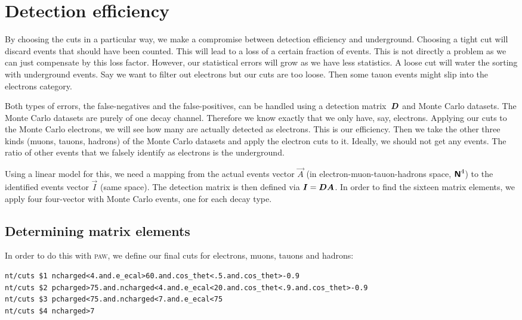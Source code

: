 \documentclass[11pt, english, fleqn, DIV=15, headinclude, BCOR=2cm]{scrreprt}
\begin{document}
\section{Detection efficiency}
\label{sec:detection-efficiency}

By choosing the cuts in a particular way, we make a compromise between
detection efficiency and underground. Choosing a tight cut will discard events
that should have been counted. This will lead to a loss of a certain fraction
of events. This is not directly a problem as we can just compensate by this
loss factor. However, our statistical errors will grow as we have less
statistics. A loose cut will water the sorting with underground events. Say we
want to filter out electrons but our cuts are too loose. Then some tauon events
might slip into the electrons category.

Both types of errors, the false-negatives and the false-positives, can be
handled using a detection matrix~$\mat D$ and Monte Carlo datasets.
The Monte Carlo datasets are purely of one decay channel. Therefore we know
exactly that we only have, say, electrons. Applying our cuts to the Monte Carlo
electrons, we will see how many are actually detected as electrons. This is our
efficiency. Then we take the other three kinds (muons, tauons, hadrons) of the
Monte Carlo datasets and apply the electron cuts to it. Ideally, we should not
get any events. The ratio of other events that we falsely identify as electrons
is the underground.

Using a linear model for this, we need a mapping from the actual events vector
$\vec A$ (in electron-muon-tauon-hadrons space, $\text{\bfseries\sffamily{N}}^4$) to the identified events
vector $\vec I$ (same space). The detection matrix is then defined via $\vec I
= \mat D \vec A$. In order to find the sixteen matrix elements, we apply four
four-vector with Monte Carlo events, one for each decay type.

\subsection{Determining matrix elements}

In order to do this with \textsc{paw}, we define our final cuts for electrons,
muons, tauons and hadrons:

\begin{lstlisting}
nt/cuts $1 ncharged<4.and.e_ecal>60.and.cos_thet<.5.and.cos_thet>-0.9
nt/cuts $2 pcharged>75.and.ncharged<4.and.e_ecal<20.and.cos_thet<.9.and.cos_thet>-0.9
nt/cuts $3 pcharged<75.and.ncharged<7.and.e_ecal<75
nt/cuts $4 ncharged>7
\end{lstlisting}
\end{document}
